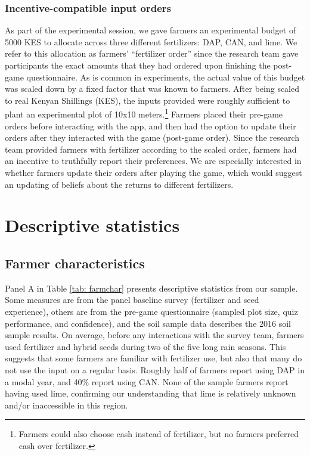 \documentclass[12pt,letterpaper]{article}
\begin{document}
\subsubsection{Incentive-compatible input orders}

As part of the experimental session, we gave farmers an experimental budget of 5000 KES to allocate across three different fertilizers: DAP, CAN, and lime. We refer to this allocation as farmers' ``fertilizer order'' since the research team gave participants the exact amounts that they had ordered upon finishing the post-game questionnaire. As is common in experiments, the actual value of this budget was scaled down by a fixed factor that was known to farmers. After being scaled to real Kenyan Shillings (KES), the inputs provided were roughly sufficient to plant an experimental plot of 10x10 meters.\footnote{Farmers could also choose cash instead of fertilizer, but no farmers preferred cash over fertilizer.} Farmers placed their pre-game orders before interacting with the app, and then had the option to update their orders after they interacted with the game (post-game order). Since the research team provided farmers with fertilizer according to the scaled order, farmers had an incentive to truthfully report their preferences. We are especially interested in whether farmers update their orders after playing the game, which would suggest an updating of beliefs about the returns to different fertilizers.

\section{Descriptive statistics}\label{sec:descriptive_stats}

\subsection{Farmer characteristics}

Panel A in Table \ref{tab: farmchar} presents descriptive statistics from our sample. Some measures are from the panel baseline survey (fertilizer and seed experience), others are from the pre-game questionnaire (sampled plot size, quiz performance, and confidence), and the soil sample data describes the 2016 soil sample results. On average, before any interactions with the survey team, farmers used fertilizer and hybrid seeds during two of the five long rain seasons. This suggests that some farmers are familiar with fertilizer use, but also that many do not use the input on a regular basis. Roughly half of farmers report using DAP in a modal year, and 40\% report using CAN. None of the sample farmers report having used lime, confirming our understanding that lime is relatively unknown and/or inaccessible in this region.
\end{document}
